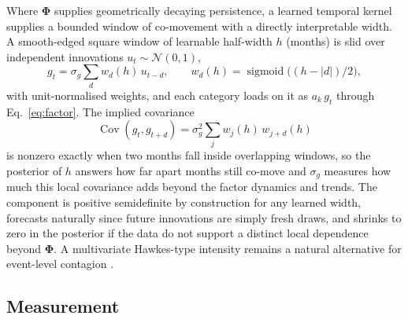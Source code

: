\documentclass[review]{elsarticle}
\begin{document}
Where $\bm{\Phi}$ supplies geometrically decaying persistence, a learned temporal kernel supplies a bounded window of co-movement with a directly interpretable width. A smooth-edged square window of learnable half-width $h$ (months) is slid over independent innovations $u_t \sim \mathcal{N}(0,1)$,
\begin{equation}\label{eq:kernel}
    g_t = \sigma_g \sum_{d} w_d(h)\, u_{t-d},
    \qquad
    w_d(h) = \operatorname{sigmoid}\!\big((h - |d|)/2\big),
\end{equation}
with unit-normalised weights, and each category loads on it as $a_k\, g_t$ through Eq.~\ref{eq:factor}. The implied covariance
\begin{equation}\label{eq:kernelcov}
    \operatorname{Cov}(g_t, g_{t+d}) = \sigma_g^2 \sum_{j} w_j(h)\, w_{j+d}(h)
\end{equation}
is nonzero exactly when two months fall inside overlapping windows, so the posterior of $h$ answers how far apart months still co-move and $\sigma_g$ measures how much this local covariance adds beyond the factor dynamics and trends. The component is positive semidefinite by construction for any learned width, forecasts naturally since future innovations are simply fresh draws, and shrinks to zero in the posterior if the data do not support a distinct local dependence beyond $\bm{\Phi}$. A multivariate Hawkes-type intensity remains a natural alternative for event-level contagion \citep{bessyroland2021}.

\subsection{Measurement}
\end{document}
